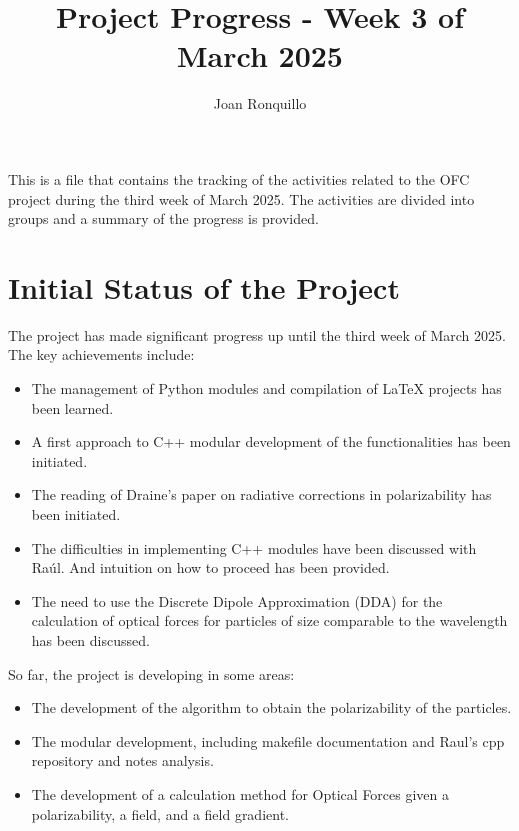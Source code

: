 \documentclass[12pt]{article}
\begin{document}
\author{Joan Ronquillo}

\title{Project Progress - Week 3 of March 2025}
\maketitle

This is a file that contains the tracking of the activities related to the OFC project during the third week of March 2025.
The activities are divided into groups and a summary of the progress is provided.

\section{Initial Status of the Project}
The project has made significant progress up until the third week of March 2025. The key achievements include:
\begin{itemize}
    \item The management of Python modules and compilation of LaTeX projects has been learned.
    \item A first approach to C++ modular development of the functionalities has been initiated.
    \item The reading of Draine's paper on radiative corrections in polarizability \cite{Draine1988ApJ...333..848D} has been initiated.
    \item The difficulties in implementing C++ modules have been discussed with Raúl. And intuition on how to proceed has been provided.
    \item The need to use the Discrete Dipole Approximation (DDA) for the calculation of optical forces for particles of size comparable to the wavelength has been discussed.
\end{itemize}
So far, the project is developing in some areas:

\begin{itemize}
    \item The development of the algorithm to obtain the polarizability of the particles.
    \item The modular development, including makefile documentation and Raul's cpp repository and notes analysis.
    \item The development of a calculation method for Optical Forces given a polarizability, a field, and a field gradient.
\end{itemize}
\end{document}
